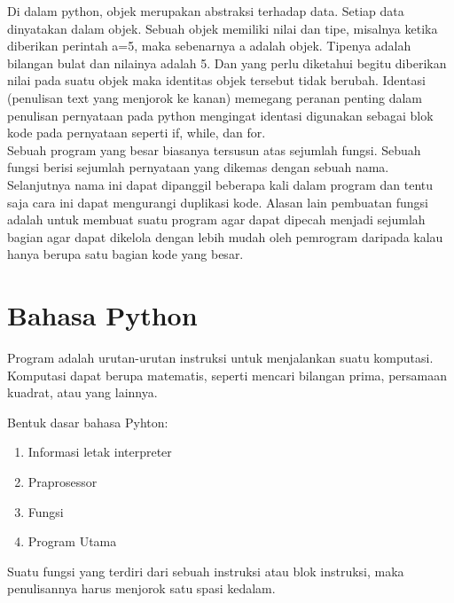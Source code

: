 \documentclass[12pt,a4paper]{article}
\begin{document}
Di dalam python, objek merupakan abstraksi terhadap data. Setiap data dinyatakan dalam objek. Sebuah objek memiliki nilai dan tipe, misalnya ketika diberikan perintah a=5, maka sebenarnya a adalah objek. Tipenya adalah bilangan bulat dan nilainya adalah 5. Dan yang perlu diketahui begitu diberikan nilai pada suatu objek maka identitas objek tersebut tidak berubah. Identasi (penulisan text yang menjorok ke kanan) memegang peranan penting dalam penulisan pernyataan pada python mengingat identasi digunakan sebagai blok kode pada pernyataan seperti if, while, dan for.\\

Sebuah program yang besar biasanya tersusun atas sejumlah fungsi. Sebuah fungsi berisi sejumlah pernyataan yang dikemas dengan sebuah nama. Selanjutnya nama ini dapat dipanggil beberapa kali dalam program dan tentu saja cara ini dapat mengurangi duplikasi kode. Alasan lain pembuatan fungsi adalah untuk membuat suatu program agar
dapat dipecah menjadi sejumlah bagian agar dapat dikelola dengan lebih mudah oleh pemrogram daripada kalau hanya berupa satu bagian kode yang besar.

\section{Bahasa Python}
Program adalah urutan-urutan instruksi untuk menjalankan suatu komputasi. Komputasi dapat berupa matematis, seperti mencari bilangan prima, persamaan kuadrat, atau yang lainnya.

Bentuk dasar bahasa Pyhton:
\begin{enumerate}
\item Informasi letak interpreter
\item Praprosessor
\item Fungsi
\item Program Utama
\end{enumerate}

Suatu fungsi yang terdiri dari sebuah instruksi atau blok instruksi, maka penulisannya harus menjorok satu spasi kedalam. \\
\end{document}
